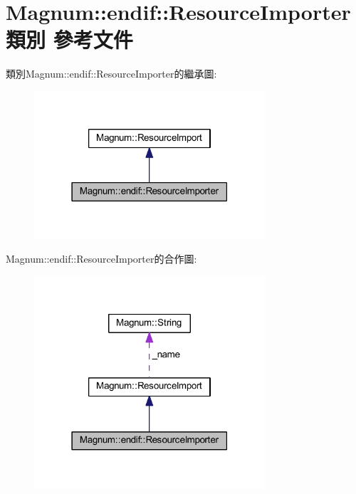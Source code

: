 \hypertarget{class_magnum_1_1endif_1_1_resource_importer}{}\section{Magnum\+:\+:endif\+:\+:Resource\+Importer 類別 參考文件}
\label{class_magnum_1_1endif_1_1_resource_importer}


類別\+Magnum\+:\+:endif\+:\+:Resource\+Importer的繼承圖\+:\nopagebreak
\begin{figure}[H]
\begin{center}
\leavevmode
\includegraphics[width=243pt]{class_magnum_1_1endif_1_1_resource_importer__inherit__graph}
\end{center}
\end{figure}


Magnum\+:\+:endif\+:\+:Resource\+Importer的合作圖\+:\nopagebreak
\begin{figure}[H]
\begin{center}
\leavevmode
\includegraphics[width=243pt]{class_magnum_1_1endif_1_1_resource_importer__coll__graph}
\end{center}
\end{figure}
